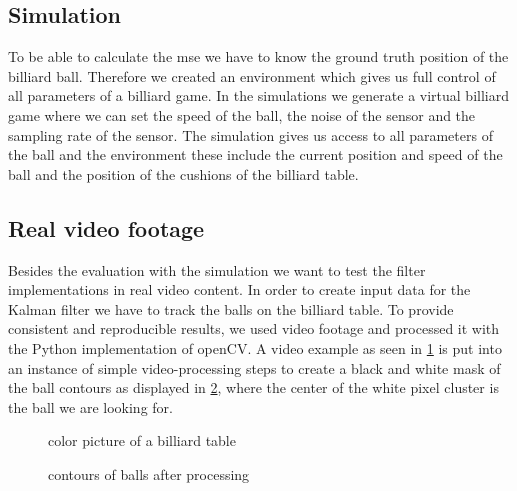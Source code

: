 \documentclass[titlepage, a4paper, 11pt]{scrartcl}
\begin{document}
\subsection{Simulation}

To be able to calculate the mse we have to know the ground truth position of the billiard ball.
Therefore we created an environment which gives us full control of all parameters of a billiard game.
In the simulations we generate a virtual billiard game where we can set the speed of the ball, the noise of the sensor and the sampling rate of the sensor.
The simulation gives us access to all parameters of the ball and the environment these include the current position and speed of the ball and the position of the cushions of the billiard table.

\subsection{Real video footage}

Besides the evaluation with the simulation we want to test the filter implementations in real video content.
In order to create input data for the Kalman filter we have to track the balls on the billiard table. 
To provide consistent and reproducible results, we used video footage and processed it with the Python implementation of openCV.
A video example as seen in \cref{pic:pool-color} is put into an instance of simple video-processing steps to create a black and white mask of the ball contours as displayed in \cref{pic:pool-bw},
where the center of the white pixel cluster is the ball we are looking for.

\begin{figure}[H]
    \centering
    \caption{color picture of a billiard table}
    \label{pic:pool-color}
\end{figure}

\begin{figure}[H]
    \centering
    \caption{contours of balls after processing}
    \label{pic:pool-bw}
\end{figure}
\end{document}
